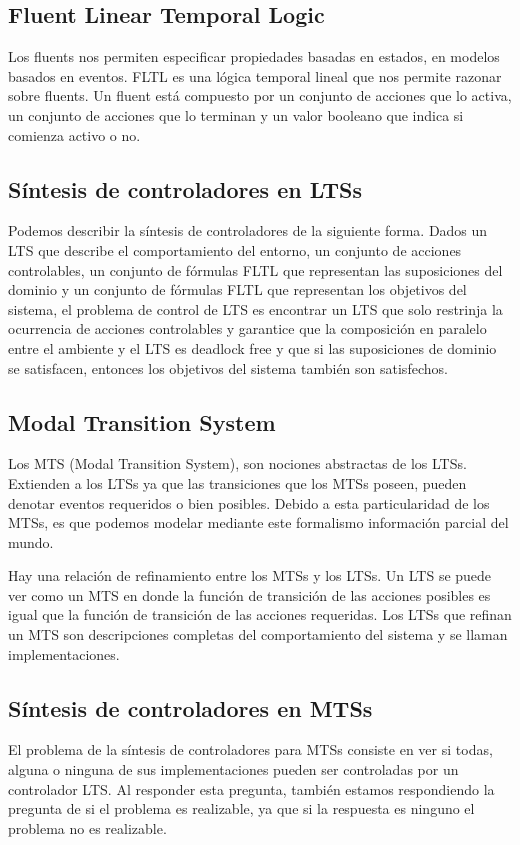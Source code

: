 \subsection{Fluent Linear Temporal Logic}
Los fluents nos permiten especificar propiedades basadas en estados, en modelos basados en eventos. FLTL es una lógica temporal lineal que nos permite razonar sobre fluents. Un fluent está compuesto por un conjunto de acciones  que lo activa, un conjunto de acciones que lo terminan y un valor booleano que indica si comienza activo o no.

\subsection{Síntesis de controladores en LTSs}
Podemos describir la síntesis de controladores de la siguiente forma. Dados un LTS que describe el comportamiento del entorno, un conjunto de acciones controlables, un conjunto de fórmulas FLTL que representan las suposiciones del dominio y un conjunto de fórmulas FLTL que representan los objetivos del sistema, el problema de control de LTS es encontrar un LTS que solo restrinja la ocurrencia de acciones controlables y garantice que la composición en paralelo entre el ambiente y el LTS es deadlock free y que si las suposiciones de dominio se satisfacen, entonces los objetivos del sistema también son satisfechos.

\subsection{Modal Transition System}
Los MTS (Modal Transition System), son nociones abstractas de los LTSs. Extienden a los LTSs ya que las transiciones 
que los MTSs poseen, pueden denotar eventos requeridos o bien posibles. Debido a esta particularidad de los MTSs, es 
que podemos modelar mediante este formalismo información parcial del mundo.

\vspace{\baselineskip}
Hay una relación de refinamiento entre los MTSs y los LTSs. Un LTS se puede ver como un MTS en donde la función de
transición de las acciones posibles es igual que la función de transición de las acciones requeridas. Los LTSs que
refinan un MTS son descripciones completas del comportamiento del sistema y se llaman implementaciones.

\subsection{Síntesis de controladores en MTSs}
El problema de la síntesis de controladores para MTSs consiste en ver si todas, alguna o ninguna de sus implementaciones pueden ser controladas por un controlador LTS. Al responder esta pregunta, también estamos respondiendo la pregunta de si el problema es realizable, ya que si la respuesta es ninguno el problema no es realizable.

